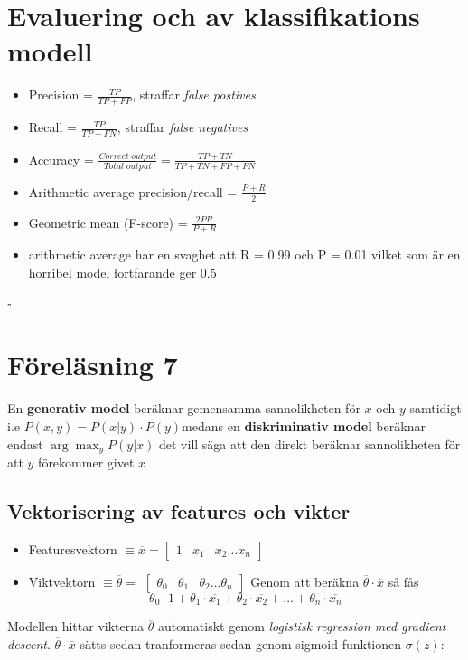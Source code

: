 \documentclass[12pt,a4paper]{article}
\begin{document}
\newpage
\section*{Evaluering och av klassifikations modell}
\begin{itemize}
    \item Precision = {\large $\frac{TP}{TP+FP}$}, straffar \textit{false postives}
    \item Recall = {\large $\frac{TP}{TP+FN}$}, straffar \textit{false negatives}
    \item Accuracy = {\large $\frac{Correct\; output}{Total\; output} = \frac{TP + TN}{TP + TN +FP +FN}$}
    \item Arithmetic average precision/recall = {\large $\frac{P+R}{2}$}
    \item Geometric mean (F-score) = {\large $\frac{2PR}{P+R}$}
    \item arithmetic average har en svaghet att R = 0.99 och P = 0.01 vilket som är en horribel model fortfarande ger 0.5
    
\end{itemize}
\noindent\hrulefill
\newline
\newline
\newline
{\Huge $\square$}
\newpage

\section*{Föreläsning 7}
En \textbf{generativ model} beräknar gemensamma sannolikheten för $x$ och $y$ samtidigt i.e {$P(x,y) = P(x|y) \cdot P(y)$}medans en \textbf{diskriminativ model} beräknar endast {$\arg \max_{y} P(y|x)$} det vill säga att den direkt beräknar sannolikheten för att $y$ förekommer givet $x$

\subsection*{Vektorisering av features och vikter}
\begin{itemize}
    \item Featuresvektorn $\equiv \overline{x} = 
    \begin{bmatrix}
    1 & x_1 & x_2 \dots x_n
    \end{bmatrix}$
    \item Viktvektorn $\equiv \overline{\theta} =$
    $\begin{bmatrix}
    \theta_0 & \theta_1 & \theta_2 \dots \theta_n
    \end{bmatrix}$
Genom att beräkna $\overline{\theta} \cdot \overline{x}$ så fås
$$\theta_0 \cdot 1 + \theta_1 \cdot \overline{x_1}+ \theta_2 \cdot \overline{x_2}+\dots+ \theta_n \cdot \overline{x_n}$$

\end{itemize}
Modellen hittar vikterna $\overline{\theta}$ automatiskt genom \textit{logistisk regression med gradient descent}. $\overline{\theta} \cdot \overline{x}$ sätts sedan tranformeras sedan genom sigmoid funktionen $\sigma(z)$:
\end{document}
